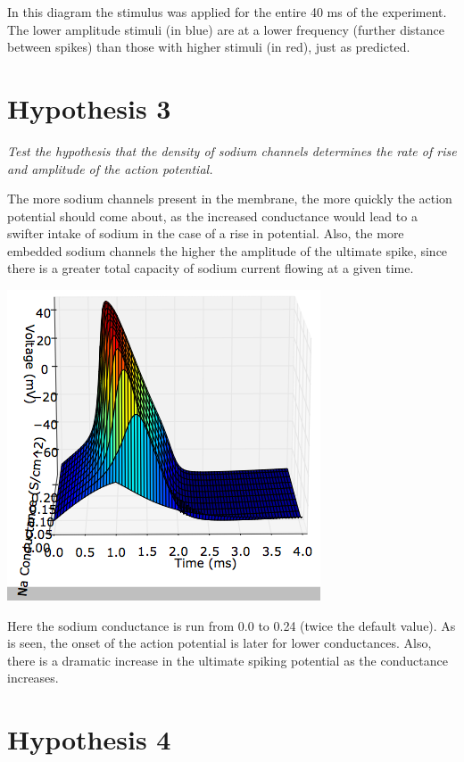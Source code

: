 \documentclass[12pt]{article}
\begin{document}
In this diagram the stimulus was applied for the entire 40 ms of the experiment.  The lower amplitude stimuli (in blue) are at a lower frequency (further distance between spikes) than those with higher stimuli (in red), just as predicted.

\section{Hypothesis 3}

\emph{Test the hypothesis that the density of sodium channels determines the rate of rise and amplitude of the action potential.}

\vspace{10pt}

The more sodium channels present in the membrane, the more quickly the action potential should come about, as the increased conductance would lead to a swifter intake of sodium in the case of a rise in potential.  Also, the more embedded sodium channels the higher the amplitude of the ultimate spike, since there is a greater total capacity of sodium current flowing at a given time.  

\includegraphics[scale=0.6]{naconductance.png}

Here the sodium conductance is run from 0.0 to 0.24 (twice the default value).  As is seen, the onset of the action potential is later for lower conductances.  Also, there is a dramatic increase in the ultimate spiking potential as the conductance increases.  

\section{Hypothesis 4}
\end{document}
